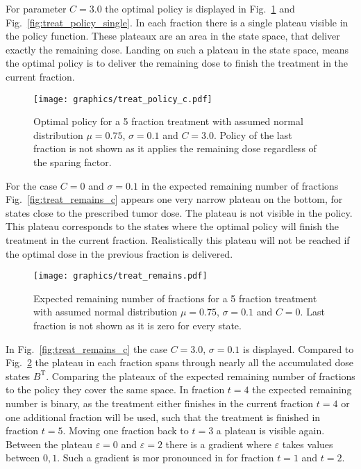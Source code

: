 \documentclass[\relativeRoot/ada.tex]{subfiles}
\begin{document}
For parameter $C=3.0$ the optimal policy is displayed in Fig.~\ref{fig:treat_policy_c} and Fig.~\ref{fig:treat_policy_single}. In each fraction there is a single plateau visible in the policy function. These plateaux are an area in the state space, that deliver exactly the remaining dose. Landing on such a plateau in the state space, means the optimal policy is to deliver the remaining dose to finish the treatment in the current fraction.

\begin{figure}[!htb]
    \centering
    \texttt{[image: graphics/treat\_policy\_c.pdf]}
    \caption{Optimal policy for a 5 fraction treatment with assumed normal distribution $\mu=0.75$, $\sigma=0.1$ and $C=3.0$. Policy of the last fraction is not shown as it applies the remaining dose regardless of the sparing factor.}
    \label{fig:treat_policy_c}
\end{figure}

For the case $C=0$ and $\sigma=0.1$ in the expected remaining number of fractions Fig.~\ref{fig:treat_remains_c} appears one very narrow plateau on the bottom, for states close to the prescribed tumor dose. The plateau is not visible in the policy. This plateau corresponds to the states where the optimal policy will finish the treatment in the current fraction. Realistically this plateau will not be reached if the optimal dose in the previous fraction is delivered.

\begin{figure}[!htb]
    \centering
    \texttt{[image: graphics/treat\_remains.pdf]}
    \caption{Expected remaining number of fractions for a 5 fraction treatment with assumed normal distribution $\mu=0.75$, $\sigma=0.1$ and $C=0$. Last fraction is not shown as it is zero for every state.}
    \label{fig:treat_remains}
\end{figure}

In Fig.~\ref{fig:treat_remains_c} the case $C=3.0$, $\sigma=0.1$ is displayed. Compared to Fig.~\ref{fig:treat_remains} the plateau in each fraction spans through nearly all the accumulated dose states $B^{\text{T}}$. Comparing the plateaux of the expected remaining number of fractions to the policy they cover the same space. In fraction $t=4$ the expected remaining number is binary, as the treatment either finishes in the current fraction $t=4$ or one additional fraction will be used, such that the treatment is finished in fraction $t=5$. Moving one fraction back to $t=3$ a plateau is visible again. Between the plateau $\varepsilon = 0$ and $\varepsilon = 2$ there is a gradient where $\varepsilon$ takes values between $0,1$. Such a gradient is mor pronounced in for fraction $t=1$ and $t=2$.
\end{document}
